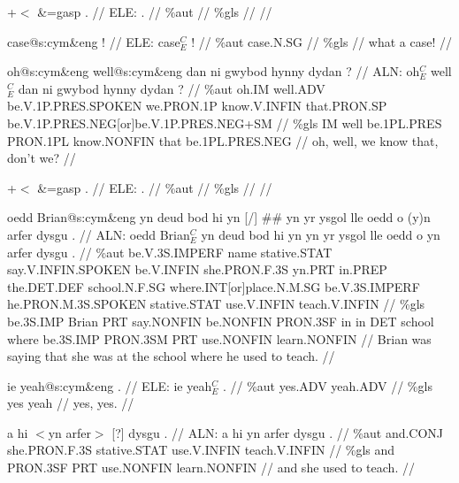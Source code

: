 \documentclass[a4paper,10pt]{article}
\begin{document}
\ex
\begingl[lingstyle=gergl]
\glchat +$<$ \&=gasp . //
\glsurface ELE:  .  //
\glauto \%aut    //
\glmanual \%gls    //
\gleng  //
\endgl
\xe

\ex
\begingl[lingstyle=gergl]
\glchat case@s:cym\&eng ! //
\glsurface ELE:  case$^{C}_{E}$ !  //
\glauto \%aut  case{\scriptsize .N.SG}   //
\glmanual \%gls     //
\gleng what a case! //
\endgl
\xe

\ex
\begingl[lingstyle=gergl]
\glchat oh@s:cym\&eng well@s:cym\&eng dan ni gwybod hynny dydan ? //
\glsurface ALN:  oh$^{C}_{E}$ well$^{C}_{E}$ dan ni gwybod hynny dydan ?  //
\glauto \%aut  oh{\scriptsize .IM} well{\scriptsize .ADV} be{\scriptsize .V.1P.PRES.SPOKEN} we{\scriptsize .PRON.1P} know{\scriptsize .V.INFIN} that{\scriptsize .PRON.SP} be{\scriptsize .V.1P.PRES.NEG[or]be.V.1P.PRES.NEG+SM}   //
\glmanual \%gls  IM well be{\scriptsize .1PL.PRES} PRON{\scriptsize .1PL} know{\scriptsize .NONFIN} that be{\scriptsize .1PL.PRES.NEG}   //
\gleng oh, well, we know that, don't we? //
\endgl
\xe

\ex
\begingl[lingstyle=gergl]
\glchat +$<$ \&=gasp . //
\glsurface ELE:  .  //
\glauto \%aut    //
\glmanual \%gls    //
\gleng  //
\endgl
\xe

\ex
\begingl[lingstyle=gergl]
\glchat oedd Brian@s:cym\&eng yn deud bod hi yn [/] \#\# yn yr ysgol lle oedd o (y)n arfer dysgu . //
\glsurface ALN:  oedd Brian$^{C}_{E}$ yn deud bod hi yn yn yr ysgol lle oedd o yn arfer dysgu .  //
\glauto \%aut  be{\scriptsize .V.3S.IMPERF} name stative{\scriptsize .STAT} say{\scriptsize .V.INFIN.SPOKEN} be{\scriptsize .V.INFIN} she{\scriptsize .PRON.F.3S} yn{\scriptsize .PRT} in{\scriptsize .PREP} the{\scriptsize .DET.DEF} school{\scriptsize .N.F.SG} where{\scriptsize .INT[or]place.N.M.SG} be{\scriptsize .V.3S.IMPERF} he{\scriptsize .PRON.M.3S.SPOKEN} stative{\scriptsize .STAT} use{\scriptsize .V.INFIN} teach{\scriptsize .V.INFIN}   //
\glmanual \%gls  be{\scriptsize .3S.IMP} Brian PRT say{\scriptsize .NONFIN} be{\scriptsize .NONFIN} PRON{\scriptsize .3SF} in in DET school where be{\scriptsize .3S.IMP} PRON{\scriptsize .3SM} PRT use{\scriptsize .NONFIN} learn{\scriptsize .NONFIN}   //
\gleng Brian was saying that she was at the school where he used to teach. //
\endgl
\xe

\ex
\begingl[lingstyle=gergl]
\glchat ie yeah@s:cym\&eng . //
\glsurface ELE:  ie yeah$^{C}_{E}$ .  //
\glauto \%aut  yes{\scriptsize .ADV} yeah{\scriptsize .ADV}   //
\glmanual \%gls  yes yeah   //
\gleng yes, yes. //
\endgl
\xe

\ex
\begingl[lingstyle=gergl]
\glchat a hi $<$yn arfer$>$ [?] dysgu . //
\glsurface ALN:  a hi yn arfer dysgu .  //
\glauto \%aut  and{\scriptsize .CONJ} she{\scriptsize .PRON.F.3S} stative{\scriptsize .STAT} use{\scriptsize .V.INFIN} teach{\scriptsize .V.INFIN}   //
\glmanual \%gls  and PRON{\scriptsize .3SF} PRT use{\scriptsize .NONFIN} learn{\scriptsize .NONFIN}   //
\gleng and she used to teach. //
\endgl
\xe
\end{document}
